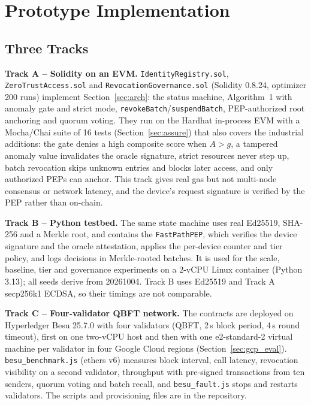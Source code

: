 \section{Prototype Implementation}\label{sec:impl}

\subsection{Three Tracks}\label{sec:env}
\textbf{Track A -- Solidity on an EVM.} \texttt{IdentityRegistry.sol}, \texttt{ZeroTrustAccess.sol} and \texttt{RevocationGovernance.sol} (Solidity 0.8.24, optimizer 200 runs) implement Section~\ref{sec:arch}: the status machine, Algorithm~1 with anomaly gate and strict mode, \texttt{revokeBatch}/\texttt{suspendBatch}, PEP-authorized root anchoring and quorum voting. They run on the Hardhat in-process EVM with a Mocha/Chai suite of 16 tests (Section~\ref{sec:assure}) that also covers the industrial additions: the gate denies a high composite score when $A>g$, a tampered anomaly value invalidates the oracle signature, strict resources never step up, batch revocation skips unknown entries and blocks later access, and only authorized PEPs can anchor. This track gives real gas but not multi-node consensus or network latency, and the device's request signature is verified by the PEP rather than on-chain.

\textbf{Track B -- Python testbed.} The same state machine uses real Ed25519, SHA-256 and a Merkle root, and contains the \texttt{FastPathPEP}, which verifies the device signature and the oracle attestation, applies the per-device counter and tier policy, and logs decisions in Merkle-rooted batches. It is used for the scale, baseline, tier and governance experiments on a 2-vCPU Linux container (Python 3.13); all seeds derive from 20261004. Track B uses Ed25519 and Track A secp256k1 ECDSA, so their timings are not comparable.

\textbf{Track C -- Four-validator QBFT network.} The contracts are deployed on Hyperledger Besu 25.7.0 with four validators (QBFT, 2\,s block period, 4\,s round timeout), first on one two-vCPU host and then with one e2-standard-2 virtual machine per validator in four Google Cloud regions (Section~\ref{sec:gcp_eval}). \texttt{besu\_benchmark.js} (ethers v6) measures block interval, call latency, revocation visibility on a second validator, throughput with pre-signed transactions from ten senders, quorum voting and batch recall, and \texttt{besu\_fault.js} stops and restarts validators. The scripts and provisioning files are in the repository.

